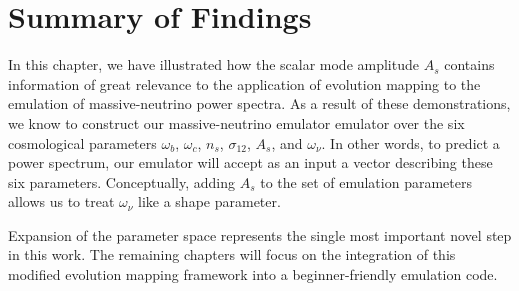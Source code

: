 \section{Summary of Findings}


In this chapter, we have illustrated how the scalar mode amplitude $A_s$
contains information of great relevance to the application of evolution
mapping to the emulation of massive-neutrino power spectra. As a result of 
these demonstrations, we know to construct 
our massive-neutrino emulator emulator over the six cosmological
parameters $\omega_b$, $\omega_c$, $n_s$, $\sigma_{12}$, $A_s$, and
$\omega_\nu$. In other words, to predict a power
spectrum, our emulator will accept as an input a vector describing
these six parameters. Conceptually, adding $A_s$ to the set of
emulation parameters allows us to treat $\omega_\nu$ like a shape
parameter.

Expansion of the parameter space represents the single most 
important novel step in this work. The remaining chapters will
focus on the integration of this modified evolution mapping framework
into a beginner-friendly emulation code.
